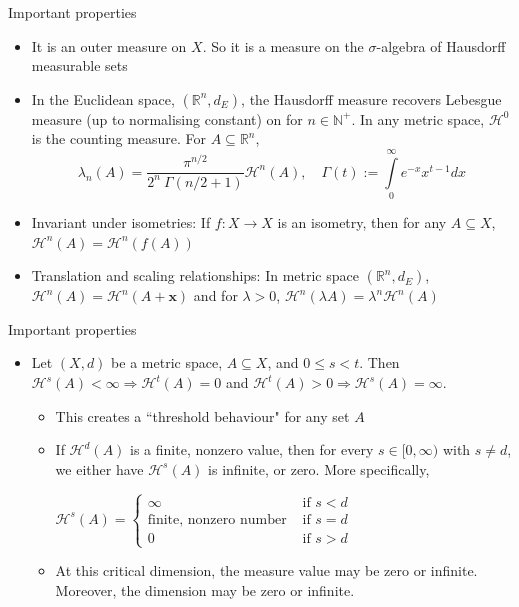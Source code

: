 \documentclass{beamer}
\begin{document}
\begin{frame}{Important properties}
\begin{itemize}
  \item It is an outer measure on $X$. So it is a measure on the $\sigma$-algebra of Hausdorff measurable sets
  \item In the Euclidean space, $(\mathbb{R}^n, d_E)$, the Hausdorff measure recovers Lebesgue measure (up to normalising constant) on for $n \in \mathbb{N}^+$. In any metric space, $\mathcal{H}^0$ is the counting measure. For $A \subseteq \mathbb{R}^n$,
  \[
  \lambda _n (A) = \frac{\pi ^{n/2}}{2^n \ \Gamma (n/2 + 1)} \mathcal{H}^n(A), \quad \Gamma (t):= \int \limits _0 ^\infty e^{-x}x^{t-1}dx 
  \]
  \item Invariant under isometries: If $f: X \to X$ is an isometry, then for any $A \subseteq X$, $\mathcal{H}^n(A) = \mathcal{H}^n(f(A))$
  \item Translation and scaling relationships: In metric space $(\mathbb{R}^n, d_E)$, $\mathcal{H}^n (A) = \mathcal{H}^n(A + \mathbf{x})$ and for $\lambda > 0$, $\mathcal{H}^n(\lambda A) = \lambda^n \mathcal{H}^n(A)$ 
\end{itemize}
\end{frame}


\begin{frame}{Important properties}
\begin{itemize}
\item Let $(X,d)$ be a metric space, $A \subseteq X$, and $0\le s<t$. Then $\mathcal{H}^s(A)<\infty\Rightarrow\mathcal{H}^t(A)=0$ and $\mathcal{H}^t(A)>0\Rightarrow\mathcal{H}^s(A)=\infty$.
  \begin{itemize}
  \item This creates a ``threshold behaviour" for any set $A$
  \item If $\mathcal{H}^d(A)$ is a finite, nonzero value, then for every $s \in [0,\infty)$ with $s \ne d$, we either have $\mathcal{H}^s(A)$ is infinite, or zero. More specifically, \begin{center}
    $\mathcal{H}^s(A) = \begin{cases}
        \infty  & \text { if }s < d \\ \text{finite, nonzero number} & \text { if } s = d \\ 0   & \text { if }s > d
    \end{cases}$
  \end{center}
  \item At this critical dimension, the measure value may be zero or infinite. Moreover, the dimension may be zero or infinite.
\end{itemize}
\end{itemize}
\end{frame}
\end{document}

